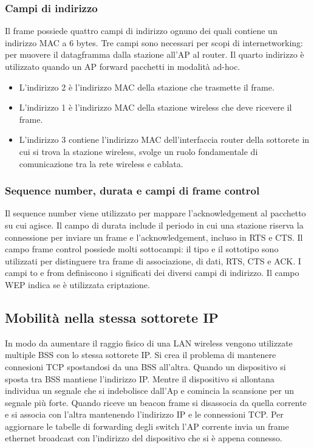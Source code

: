 \subsubsection{Campi di indirizzo}
Il frame possiede quattro campi di indirizzo ognuno dei quali contiene un indirizzo MAC a 6 bytes. Tre campi sono necessari per scopi di internetworking: per muovere il datagframma dalla stazione all'AP al
router. Il quarto indirizzo \`e utilizzato quando un AP forward pacchetti in modalit\`a ad-hoc. 
\begin{itemize}
\item L'indirizzo 2 \`e l'indirizzo MAC della stazione che trasmette il frame. 
\item L'indirizzo 1 \`e l'indirizzo MAC della stazione wireless che deve ricevere il frame. 
\item L'indirizzo 3 contiene l'indirizzo MAC dell'interfaccia router della sottorete in cui si trova la stazione wireless, svolge un ruolo fondamentale di comunicazione tra la rete wireless e cablata.
\end{itemize}
\subsubsection{Sequence number, durata  e campi di frame control}
Il sequence number viene utilizzato per mappare l'acknowledgement al pacchetto su cui agisce. Il campo di durata include il periodo in cui una stazione riserva la connessione per inviare un frame e 
l'acknowledgement, incluso in RTS e CTS. Il campo frame control possiede molti sottocampi: il tipo e il sottotipo sono utilizzati per distinguere tra frame di associazione, di dati, RTS, CTS e ACK. I campi to e 
from definiscono i significati dei diversi campi di indirizzo. Il campo WEP indica se \`e utilizzata criptazione.
\subsection{Mobilit\`a nella stessa sottorete IP}
In modo da aumentare il raggio fisico di una LAN wireless vengono utilizzate multiple BSS con lo stessa sottorete IP. Si crea il problema di mantenere connesioni TCP spostandosi da una BSS all'altra. Quando
un dispositivo si sposta tra BSS mantiene l'indirizzo IP. Mentre il dispositivo si allontana individua un segnale che si indebolisce dall'Ap e comincia la scansione per un segnale pi\`u forte. Quando riceve un 
beacon frame si disassocia da quella corrente e si associa con l'altra mantenendo l'indirizzo IP e le connessioni TCP. Per aggiornare le tabelle di forwarding degli switch l'AP corrente invia un frame ethernet 
broadcast con l'indirizzo del dispositivo che si \`e appena connesso. 